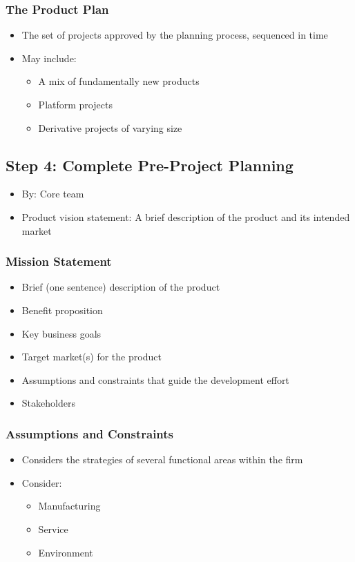 \documentclass[a4paper,12pt,openany]{book}
\begin{document}
\subsubsection{The Product Plan}
\begin{itemize}
    \item The set of projects approved by the planning process, sequenced in time
    \item May include:
    \begin{itemize}
        \item A mix of fundamentally new products
        \item Platform projects
        \item Derivative projects of varying size
    \end{itemize}
\end{itemize}
\subsection{Step 4: Complete Pre-Project Planning}
\begin{itemize}
    \item By: Core team
    \item Product vision statement: A brief description of the product and its intended market
\end{itemize}
\subsubsection{Mission Statement}
\begin{itemize}
    \item Brief (one sentence) description of the product
    \item Benefit proposition
    \item Key business goals
    \item Target market(s) for the product
    \item Assumptions and constraints that guide the development effort
    \item Stakeholders
\end{itemize}
\subsubsection{Assumptions and Constraints}
\begin{itemize}
    \item Considers the strategies of several functional areas within the firm
    \item Consider:
    \begin{itemize}
        \item Manufacturing
        \item Service
        \item Environment
    \end{itemize}
\end{itemize}
\end{document}
